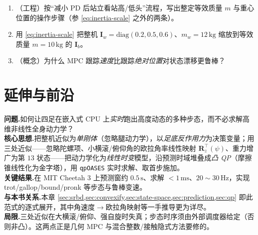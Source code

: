 \begin{practice}
\begin{enumerate}
  \item （工程）按“减小 PD 后站立看站高/低头”流程，写出整定等效质量 $m$ 与重心位置的操作步骤（参 \cref{eq:inertia-scale} 之外的两条）。
  \item 用 \cref{eq:inertia-scale} 把整机 $\mathbf{I}_w=\mathrm{diag}(0.2,0.5,0.6)$、$m_w=12\,\mathrm{kg}$ 缩放到等效质量 $m=10\,\mathrm{kg}$ 的 $\mathbf{I}_b$。
  \item （概念）为什么 MPC 跟踪\emph{速度}比跟踪\emph{绝对位置}对状态漂移更鲁棒？
\end{enumerate}
\end{practice}

\section{延伸与前沿}
\label{sec:frontier}

\begin{paper}\label{paper:dicarlo}
\textbf{问题.}\;如何让四足在嵌入式 CPU 上\emph{实时}跑出高度动态的多种步态，而不必求解高维非线性全身动力学？\\
\textbf{核心思想.}\;把整机近似为\emph{单刚体}（忽略腿动力学），以\emph{足底反作用力}为决策变量；用三处近似——忽略陀螺项、小横滚/俯仰角的欧拉角率线性映射 $\mathbf{R}_z^\top(\psi)$、重力增广为第 $13$ 状态——把动力学化为\emph{线性时变}模型，沿预测时域堆叠成\emph{凸 QP}（摩擦锥线性化为金字塔），用 \texttt{qpOASES} 实时求解、取首步施加。\\
\textbf{关键结果.}\;在 MIT Cheetah 3\cite{bledt2018cheetah3} 上预测窗约 $0.5\,\mathrm{s}$、求解 $<1\,\mathrm{ms}$、$20\sim30\,\mathrm{Hz}$，实现 trot/gallop/bound/pronk 等步态与鲁棒变速。\\
\textbf{与本书关系.}\;本章 \cref{sec:srbd,sec:convexify,sec:state-space,sec:prediction,sec:qp} 即此范式的逐式展开，其中角速度$\to$欧拉角映射等一手推导更为详尽\cite{yu2021quadruped}。\\
\textbf{局限.}\;三处近似在大横滚/俯仰、强自旋时失真；步态时序须由外部调度器给定（否则非凸）。这两点正是几何 MPC 与混合整数/接触隐式方法要修的。
\end{paper}

